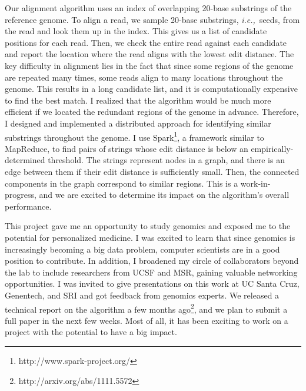 \documentclass{article}
\newcommand{\ie}{{\em i.e.,}~}
\begin{document}
Our alignment algorithm uses an index of overlapping 20-base substrings of the reference genome.
To align a read, we sample 20-base substrings, \ie seeds, from the read and look them up in the index.
This gives us a list of candidate positions for each read.
Then, we check the entire read against each candidate and report the location where the read aligns with the lowest edit distance.
The key difficulty in alignment lies in the fact that since some regions of the genome are repeated many times, some reads align to many locations throughout the genome.
This results in a long candidate list, and it is computationally expensive to find the best match.
I realized that the algorithm would be much more efficient if we located the redundant regions of the genome in advance.
Therefore, I designed and implemented a distributed approach for identifying similar substrings throughout the genome.
I use Spark\footnote{http://www.spark-project.org/}, a framework similar to MapReduce, to find pairs of strings whose edit distance is below an empirically-determined threshold.
The strings represent nodes in a graph, and there is an edge between them if their edit distance is sufficiently small.
Then, the connected components in the graph correspond to similar regions.
This is a work-in-progress, and we are excited to determine its impact on the algorithm's overall performance.

This project gave me an opportunity to study genomics and exposed me to the potential for personalized medicine.
I was excited to learn that since genomics is increasingly becoming a big data problem, computer scientists are in a good position to contribute.
In addition, I broadened my circle of collaborators beyond the lab to include researchers from UCSF and MSR, gaining valuable networking opportunities.
I was invited to give presentations on this work at UC Santa Cruz, Genentech, and SRI and got feedback from genomics experts.
We released a technical report on the algorithm a few months ago\footnote{http://arxiv.org/abs/1111.5572}, and we plan to submit a full paper in the next few weeks.
Most of all, it has been exciting to work on a project with the potential to have a big impact.
\end{document}
